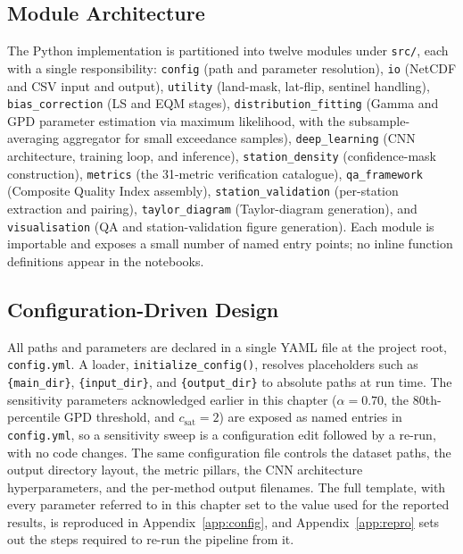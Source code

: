 \subsection{Module Architecture}

The Python implementation is partitioned into twelve modules under
\texttt{src/}, each with a single responsibility:
\texttt{config} (path and parameter resolution),
\texttt{io} (NetCDF and CSV input and output),
\texttt{utility} (land-mask, lat-flip, sentinel handling),
\texttt{bias\_correction} (LS and EQM stages),
\texttt{distribution\_fitting} (Gamma and GPD parameter
estimation via maximum likelihood, with the subsample-averaging
aggregator for small exceedance samples),
\texttt{deep\_learning} (CNN architecture, training loop, and
inference),
\texttt{station\_density} (confidence-mask construction),
\texttt{metrics} (the 31-metric verification catalogue),
\texttt{qa\_framework} (Composite Quality Index assembly),
\texttt{station\_validation} (per-station extraction and pairing),
\texttt{taylor\_diagram} (Taylor-diagram generation), and
\texttt{visualisation} (QA and station-validation figure
generation). Each module is importable and exposes a small number
of named entry points; no inline function definitions appear in
the notebooks.

\subsection{Configuration-Driven Design}

All paths and parameters are declared in a single YAML file at
the project root, \texttt{config.yml}. A loader,
\texttt{initialize\_config()}, resolves placeholders such as
\texttt{\{main\_dir\}}, \texttt{\{input\_dir\}}, and
\texttt{\{output\_dir\}} to absolute paths at run time. The
sensitivity parameters acknowledged earlier in this chapter
($\alpha = 0.70$, the 80th-percentile GPD threshold, and
$c_{\text{sat}} = 2$) are exposed as named entries in
\texttt{config.yml}, so a sensitivity sweep is a configuration
edit followed by a re-run, with no code changes. The same
configuration file controls the dataset paths, the output
directory layout, the metric pillars, the CNN architecture
hyperparameters, and the per-method output filenames. The full
template, with every parameter referred to in this chapter set to
the value used for the reported results, is reproduced in
Appendix~\ref{app:config}, and
Appendix~\ref{app:repro} sets out the steps required to re-run
the pipeline from it.

